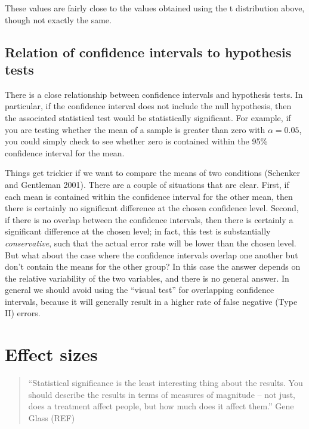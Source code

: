 \documentclass[]{book}
\theoremstyle{definition}
\theoremstyle{definition}
\theoremstyle{definition}
\theoremstyle{remark}
\begin{document}
These values are fairly close to the values obtained using the t
distribution above, though not exactly the same.

\subsection{Relation of confidence intervals to hypothesis
tests}\label{relation-of-confidence-intervals-to-hypothesis-tests}

There is a close relationship between confidence intervals and
hypothesis tests. In particular, if the confidence interval does not
include the null hypothesis, then the associated statistical test would
be statistically significant. For example, if you are testing whether
the mean of a sample is greater than zero with \(\alpha = 0.05\), you
could simply check to see whether zero is contained within the 95\%
confidence interval for the mean.

Things get trickier if we want to compare the means of two conditions
(Schenker and Gentleman 2001). There are a couple of situations that are
clear. First, if each mean is contained within the confidence interval
for the other mean, then there is certainly no significant difference at
the chosen confidence level. Second, if there is no overlap between the
confidence intervals, then there is certainly a significant difference
at the chosen level; in fact, this test is substantially
\emph{conservative}, such that the actual error rate will be lower than
the chosen level. But what about the case where the confidence intervals
overlap one another but don't contain the means for the other group? In
this case the answer depends on the relative variability of the two
variables, and there is no general answer. In general we should avoid
using the ``visual test'' for overlapping confidence intervals, because
it will generally result in a higher rate of false negative (Type II)
errors.

\section{Effect sizes}\label{effect-sizes}

\begin{quote}
``Statistical significance is the least interesting thing about the
results. You should describe the results in terms of measures of
magnitude -- not just, does a treatment affect people, but how much does
it affect them.'' Gene Glass (REF)
\end{quote}
\end{document}
